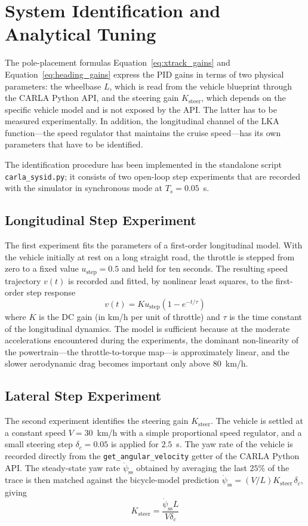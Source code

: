 \section{System Identification and Analytical Tuning}
\label{sec:sysid}
The pole-placement formulas Equation~\eqref{eq:xtrack_gains} and Equation~\eqref{eq:heading_gains} express the PID gains in terms of two physical parameters: the wheelbase $L$, which is read from the vehicle blueprint through the CARLA Python API, and the steering gain $K_{\mathrm{steer}}$, which depends on the specific vehicle model and is not exposed by the API. The latter has to be measured experimentally. In addition, the longitudinal channel of the \ac{LKA} function---the speed regulator that maintains the cruise speed---has its own parameters that have to be identified.

The identification procedure has been implemented in the standalone script \texttt{carla\_sysid.py}; it consists of two open-loop step experiments that are recorded with the simulator in synchronous mode at $T_s = 0.05$~s.

\subsection{Longitudinal Step Experiment}
The first experiment fits the parameters of a first-order longitudinal model. With the vehicle initially at rest on a long straight road, the throttle is stepped from zero to a fixed value $u_{\mathrm{step}} = 0.5$ and held for ten seconds. The resulting speed trajectory $v(t)$ is recorded and fitted, by nonlinear least squares, to the first-order step response
\begin{equation}
    v(t) = K u_{\mathrm{step}}\left(1 - e^{-t/\tau}\right)
\end{equation}
where $K$ is the DC gain (in km/h per unit of throttle) and $\tau$ is the time constant of the longitudinal dynamics. The model is sufficient because at the moderate accelerations encountered during the experiments, the dominant non-linearity of the powertrain---the throttle-to-torque map---is approximately linear, and the slower aerodynamic drag becomes important only above $80$~km/h.

\subsection{Lateral Step Experiment}
The second experiment identifies the steering gain $K_{\mathrm{steer}}$. The vehicle is settled at a constant speed $V = 30$~km/h with a simple proportional speed regulator, and a small steering step $\delta_c = 0.05$ is applied for $2.5$~s. The yaw rate of the vehicle is recorded directly from the \texttt{get\_angular\_velocity} getter of the CARLA Python API. The steady-state yaw rate $\dot{\psi}_{\mathrm{ss}}$ obtained by averaging the last $25\%$ of the trace is then matched against the bicycle-model prediction $\dot{\psi}_{\mathrm{ss}} = (V / L) K_{\mathrm{steer}}\,\delta_c$, giving
\begin{equation}
    K_{\mathrm{steer}} = \frac{\dot{\psi}_{\mathrm{ss}} L}{V \delta_c}
\end{equation}

